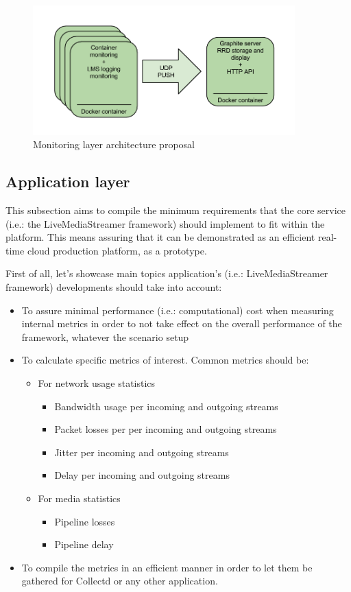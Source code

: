 \begin{figure}[htb]
\begin{center}
\includegraphics[width=0.9\textwidth]{./images/mlap.png}
\caption{Monitoring layer architecture proposal}
\label{F:MLAP}
\end{center}
\end{figure}

\subsection{Application layer}\label{B:appLayerCH2}

This subsection aims to compile the minimum requirements that the core service (i.e.: the LiveMediaStreamer framework) should implement to fit within the platform. This means assuring that it can be demonstrated as an efficient real-time cloud production platform, as a prototype.

First of all, let's showcase main topics application's (i.e.: LiveMediaStreamer framework) developments should take into account:

\begin{itemize}
	\item To assure minimal performance (i.e.: computational) cost when measuring internal metrics in order to not take effect on the overall performance of the framework, whatever the scenario setup
	\item To calculate specific metrics of interest. Common metrics should be:
	\begin{itemize}
		\item For network usage statistics
		\begin{itemize}
			\item Bandwidth usage per incoming and outgoing streams
			\item Packet losses per per incoming and outgoing streams
			\item Jitter per incoming and outgoing streams
			\item Delay per incoming and outgoing streams
		\end{itemize}
		\item For media statistics
		\begin{itemize}
			\item Pipeline losses 
			\item Pipeline delay  
		\end{itemize}
	\end{itemize}
	\item To compile the metrics in an efficient manner in order to let them be gathered for Collectd or any other application.
\end{itemize}

